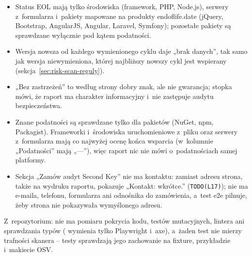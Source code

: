 \begin{itemize}
  \item Status EOL mają tylko środowiska (framework, PHP, Node.js), serwery z~formularza
        i~pakiety mapowane na produkty endoflife.date (jQuery, Bootstrap, AngularJS, Angular,
        Laravel, Symfony); pozostałe pakiety są sprawdzane wyłącznie pod kątem podatności.
  \item Wersja nowsza od każdego wymienionego cyklu daje „brak danych”, tak samo jak wersja
        niewymieniona, której najbliższy nowszy cykl jest wspierany
        (sekcja~\ref{sec:risk-scan-reguly}).
  \item „Bez zastrzeżeń” to według strony dobry znak, ale nie gwarancja; stopka mówi, że
        raport ma charakter informacyjny i~nie zastępuje audytu bezpieczeństwa.
  \item Znane podatności są sprawdzane tylko dla pakietów (NuGet, npm, Packagist). Frameworki
        i~środowiska uruchomieniowe z~pliku oraz serwery z~formularza mają co najwyżej ocenę końca
        wsparcia (w~kolumnie „Podatności” mają „---”), więc raport nic nie mówi o~podatnościach
        samej platformy.
  \item Sekcja „Zamów audyt Second Key” nie ma kontaktu: zamiast adresu strona, także na
        wydruku raportu, pokazuje „Kontakt: wkrótce.” (\texttt{TODO(L17)}); nie ma e-maila,
        telefonu, formularza ani odnośnika do zamówienia, a~test e2e pilnuje, żeby strona nie
        pokazywała wymyślonego adresu.
\end{itemize}

Z~repozytorium: nie ma pomiaru pokrycia kodu, testów mutacyjnych, lintera ani sprawdzania typów
( wymienia tylko Playwright i~axe), a~żaden test nie mierzy trafności
skanera -- testy sprawdzają jego zachowanie na fixture, przykładzie i~makiecie OSV.



